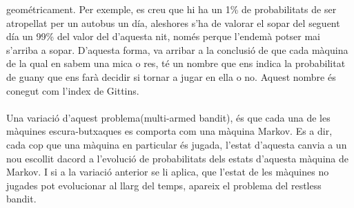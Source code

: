 geométricament. Per exemple, es creu que hi ha un 1\% de probabilitats de 
ser atropellat per un autobus un día, aleshores s'ha de valorar el sopar del
seguent día un 99\% del valor del d'aquesta nit, només perque l'endemà potser mai
s'arriba a sopar. D'aquesta forma, va arribar a la conclusió de que cada màquina 
de la qual en sabem una mica o res, té un nombre que ens indica la probabilitat
de guany que ens farà decidir si tornar a jugar en ella o no. Aquest
nombre és conegut com l'index de Gittins.\\\\
Una variació d'aquest problema(multi-armed bandit), és que cada una de 
les màquines escura-butxaques es comporta com una màquina Markov. Es a dir,
cada cop que una màquina en particular és jugada, l'estat d'aquesta canvia
a un nou escollit dacord a l'evolució de probabilitats dels estats d'aquesta màquina de Markov.
I si a la variació anterior se li aplica, que l'estat de les màquines no jugades 
pot evolucionar al llarg del temps, apareix el problema del restless bandit.  

